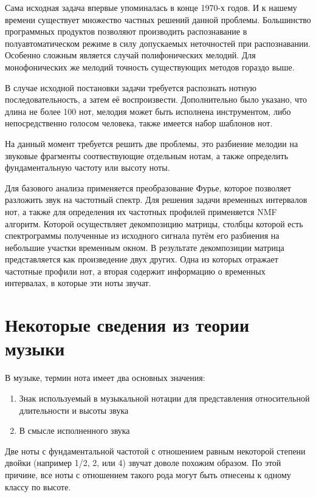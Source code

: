 \documentclass[oneside, final, 12pt]{extarticle}
\begin{document}
  Сама исходная задача впервые упоминалась в конце 1970-х годов. И к нашему
  времени существует множество частных решений данной проблемы. Большинство
  программных продуктов позволяют производить распознавание в
  полуавтоматическом режиме в силу допускаемых неточностей при распознавании.
  Особенно сложным является случай полифонических мелодий.  Для
  монофонических же мелодий точность существующих методов гораздо выше.

  В случае исходной постановки задачи требуется распознать нотную
  последовательность, а затем её воспроизвести. Дополнительно было указано,
  что длина не более 100 нот, мелодия может быть исполнена инструментом, либо
  непосредственно голосом человека, также имеется набор шаблонов нот.

  На данный момент требуется решить две проблемы, это разбиение мелодии на
  звуковые фрагменты соотвествующие отдельным нотам, а также определить
  фундаментальную частоту или высоту ноты.

  Для базового анализа применяется преобразование Фурье, которое позволяет
  разложить звук на частотный спектр. Для решения задачи временных
  интервалов нот, а также для определения их частотных профилей
  применяется NMF алгоритм. Которой осуществляет декомпозицию
  матрицы, столбцы которой есть спектрограммы полученные из исходного
  сигнала путём его разбиения на небольшие участки временным окном.
  В результате декомпозиции матрица представляется как произведение
  двух других. Одна из которых отражает частотные профили нот, а вторая
  содержит информацию о временных интервалах, в которые эти ноты звучат.

\cleardoublepage

\section{Некоторые сведения из теории музыки}

  В музыке, термин нота имеет два основных значения:

  \begin{enumerate}
    \item Знак используемый в музыкальной нотации для представления
      относительной длительности и высоты звука
    \item В смысле исполненного звука
  \end{enumerate}

  Две ноты с фундаментальной частотой с отношением равным некоторой
  степени двойки (например 1/2, 2, или 4) звучат доволе похожим
  образом. По этой причине, все ноты с отношением такого рода могут
  быть отнесены к одному классу по высоте.
\end{document}
